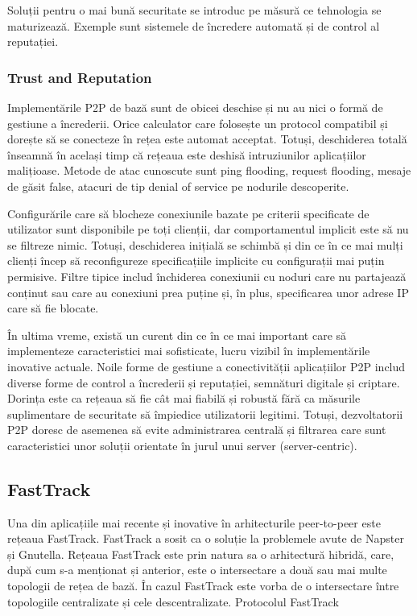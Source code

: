 Soluții pentru o mai bună securitate se introduc pe măsură ce tehnologia se
maturizează. Exemple sunt sistemele de încredere automată și de control al
reputației.

\subsubsection{Trust and Reputation}

Implementările P2P de bază sunt de obicei deschise și nu au nici o formă de
gestiune a încrederii. Orice calculator care folosește un protocol compatibil
și dorește să se conecteze în rețea este automat acceptat. Totuși, deschiderea
totală înseamnă în același timp că rețeaua este deshisă intruziunilor
aplicațiilor malițioase. Metode de atac cunoscute sunt ping flooding, request
flooding, mesaje de găsit false, atacuri de tip denial of service pe nodurile
descoperite.

Configurările care să blocheze conexiunile bazate pe criterii specificate de
utilizator sunt disponibile pe toți clienții, dar comportamentul implicit este
să nu se filtreze nimic. Totuși, deschiderea inițială se schimbă și din ce în
ce mai mulți clienți încep să reconfigureze specificațiile implicite cu
configurații mai puțin permisive. Filtre tipice includ închiderea conexiunii
cu noduri care nu partajează conținut sau care au conexiuni prea puține și, în
plus, specificarea unor adrese IP care să fie blocate.

În ultima vreme, există un curent din ce în ce mai important care să
implementeze caracteristici mai sofisticate, lucru vizibil în implementările
inovative actuale. Noile forme de gestiune a conectivității aplicațiilor P2P
includ diverse forme de control a încrederii și reputației, semnături digitale
și criptare. Dorința este ca rețeaua să fie cât mai fiabilă și robustă fără ca
măsurile suplimentare de securitate să împiedice utilizatorii legitimi.
Totuși, dezvoltatorii P2P doresc de asemenea să evite administrarea centrală
și filtrarea care sunt caracteristici unor soluții orientate în jurul unui
server (server-centric).

\subsection{FastTrack}

Una din aplicațiile mai recente și inovative în arhitecturile peer-to-peer
este rețeaua FastTrack. FastTrack a sosit ca o soluție la problemele avute de
Napster și Gnutella. Rețeaua FastTrack este prin natura sa o arhitectură
hibridă, care, după cum s-a menționat și anterior, este o intersectare a două
sau mai multe topologii de rețea de bază. În cazul FastTrack este vorba de o
intersectare între topologiile centralizate și cele descentralizate.
Protocolul FastTrack

